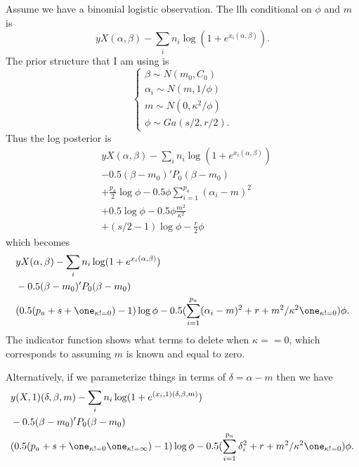 \documentclass[]{article}
\begin{document}
Assume we have a binomial logistic observation.  The llh conditional on $\phi$
and $m$ is
\[
y X (\alpha, \beta) - \sum_i n_i \log (1 + e^{x_i (\alpha, \beta)}).
\]
The prior structure that I am using is
\[
\begin{cases}
\beta \sim N(m_0, C_0) \\
\alpha_i \sim N(m, 1/\phi) \\
m \sim N(0, \kappa^2 / \phi) \\
\phi \sim Ga(s/2, r/2).
\end{cases}
\]
Thus the log posterior is
\begin{align*}
& y X (\alpha, \beta) - \sum_i n_i \log (1 + e^{x_i (\alpha, \beta)}) \\
& - 0.5 (\beta - m_0)' P_0 (\beta - m_0) \\
& + \frac{p_a}{2} \log \phi - 0.5 \phi \sum_{i=1}^{p_a} (\alpha_i - m)^2 \\
& + 0.5 \log \phi - 0.5 \phi \frac{m^2}{\kappa^2} \\
& + (s/2 - 1) \log \phi - \frac{r}{2} \phi
\end{align*}
which becomes
\begin{align*}
& y X (\alpha, \beta) - \sum_i n_i \log (1 + e^{x_i (\alpha, \beta)}) \\
& - 0.5 (\beta - m_0)' P_0 (\beta - m_0) \\
& (0.5 (p_a + s + \one_{\kappa != 0}) - 1) \log \phi - 0.5 (\sum_{i=1}^{p_a}
(\alpha_i - m)^2 + r + m^2 / \kappa^2 \one_{\kappa != 0}) \phi.
\end{align*}
The indicator function shows what terms to delete when $\kappa == 0$, which
corresponds to assuming $m$ is known and equal to zero.

Alternatively, if we parameterize things in terms of $\delta = \alpha - m$ then
we have
\begin{align*}
& y (X,1) (\delta, \beta, m) - \sum_i n_i \log (1 + e^{(x_i,1) (\delta, \beta, m)}) \\
& - 0.5 (\beta - m_0)' P_0 (\beta - m_0) \\
& (0.5 (p_a + s + \one_{\kappa != 0} \one_{\kappa != \infty}) - 1) \log \phi - 0.5 (\sum_{i=1}^{p_a}
\delta_i^2 + r + m^2 / \kappa^2 \one_{\kappa != 0}) \phi.
\end{align*}
\end{document}
